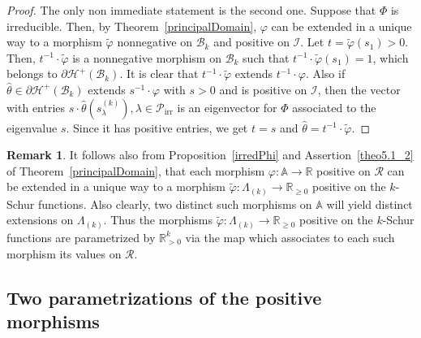 \documentclass[10pt,a4paper]{amsart}
\theoremstyle{definition}
\newtheorem{rema}[theorem]{Remark}
\DeclareMathOperator{\irr}{irr}
\begin{document}
\begin{proof}
The only non immediate statement is the second one. Suppose that $\Phi$ is
irreducible. Then, by Theorem~\ref{principalDomain}, $\varphi$ can be extended
in a unique way to a morphism $\widetilde{\varphi}$ nonnegative on
$\mathcal{B}_{k}$ and positive on $\mathcal{I}$. Let $t=\widetilde{\varphi
}(s_{1})>0$. Then, $t^{-1}\cdot\widetilde{\varphi}$ is a nonnegative morphism
on $\mathcal{B}_{k}$ such that $t^{-1}\cdot\widetilde{\varphi}(s_{1})=1$,
which belongs to $\partial\mathcal{H}^{+}(\mathcal{B}_{k})$. It is clear that
$t^{-1}\cdot\widetilde{\varphi}$ extends $t^{-1}\cdot\varphi$. Also if
$\widehat{\theta}\in\partial\mathcal{H}^{+}(\mathcal{B}_{k})$ extends
$s^{-1}\cdot\varphi$ with $s>0$ and is positive on $\mathcal{I}$, then the
vector with entries $s\cdot\widehat{\theta}(s_{\lambda}^{(k)}),\lambda
\in\mathcal{P}_{\irr }$ is an eigenvector for $\Phi$ associated to the
eigenvalue $s$. Since it has positive entries, we get $t=s$ and $\widehat
{\theta}=t^{-1}\cdot\widetilde{\varphi}$.
\end{proof}

\begin{rema}
\label{Rem_param}It follows also from Proposition~\ref{irredPhi} and Assertion~\eqref{theo5.1_2}
 of Theorem~\ref{principalDomain}, that each morphism $\varphi:\mathbb{A}%
\rightarrow\mathbb{R}$ positive on $\mathcal{R}$ can be extended in a unique
way to a morphism $\widetilde{\varphi}:\Lambda_{(k)}\longrightarrow
\mathbb{R}_{\geq0}$ positive on the $k$-Schur functions. Also clearly, two
distinct such morphisms on $\mathbb{A}$ will yield distinct extensions on
$\Lambda_{(k)}$. Thus the morphisms $\widetilde{\varphi}:\Lambda
_{(k)}\longrightarrow\mathbb{R}_{\geq0}$ positive on the $k$-Schur functions
are parametrized by $\mathbb{R}_{>0}^{k}$ via the map which associates to each
such morphism its values on $\mathcal{R}$.
\end{rema}

\subsection{Two parametrizations of the positive morphisms}
\end{document}
